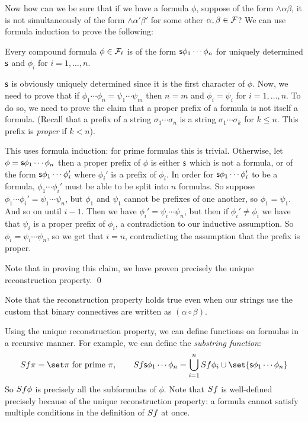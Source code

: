 \elemm

Now how can we be sure that if we have a formula $\phi$, suppose of the form $\land\alpha\beta$,
it is not simultaneously of the form $\land\alpha'\beta'$ for some other
$\alpha,\beta\in{\cal F}$?
We can use formula induction to prove the following:

\blemm[title=The Unique Formula Reconstruction Property]

    Every compound formula $\phi\in{\cal F}_\ell$ is of the form ${\sf s}\phi_1\cdots\phi_n$ for
    uniquely determined ${\sf s}$ and $\phi_i$ for $i=1,\dots,n$.

\elemm

\Proof ${\sf s}$ is obviously uniquely determined since it is the first character of $\phi$.
Now, we need to prove that if $\phi_1\cdots\phi_n=\psi_1\cdots\psi_m$ then $n=m$ and $\phi_i=\psi_i$
for $i=1,\dots,n$.
To do so, we need to prove the claim that a proper prefix of a formula is not itself a formula.
(Recall that a prefix of a string $\sigma_1\cdots\sigma_n$ is a string $\sigma_1\cdots\sigma_k$ for
$k\leq n$.
This prefix is {\it proper} if $k<n$).

This uses formula induction: for prime formulas this is trivial.
Otherwise, let $\phi={\sf s}\phi_1\cdots\phi_n$ then a proper prefix of $\phi$ is either ${\sf s}$ which
is not a formula, or of the form ${\sf s}\phi_1\cdots\phi_i'$ where $\phi_i'$ is a prefix of
$\phi_i$.
In order for ${\sf s}\phi_1\cdots\phi_i'$ to be a formula, $\phi_1\cdots\phi_i'$ must be able to be
split into $n$ formulas.
So suppose $\phi_1\cdots\phi_i'=\psi_1\cdots\psi_n$, but $\phi_1$ and $\psi_1$ cannot be prefixes
of one another, so $\phi_1=\psi_1$.
And so on until $i-1$.
Then we have $\phi_i'=\psi_i\cdots\psi_n$, but then if $\phi_i'\neq\phi_i$ we have that $\psi_i$
is a proper prefix of $\phi_i$, a contradiction to our inductive assumption.
So $\phi_i=\psi_i\cdots\psi_n$, so we get that $i=n$, contradicting the assumption that the prefix
is proper.

Note that in proving this claim, we have proven precisely the unique reconstruction property.
\qed

Note that the reconstruction property holds true even when our strings use the custom that binary
connectives are written as $(\alpha\circ\beta)$.

Using the unique reconstruction property, we can define functions on formulas in a recursive
manner.
For example, we can define the {\it substring function}:
$$ {\sl Sf}\pi=\set\pi\hbox{ for prime $\pi$},
\qquad {\sl Sf}\s s\phi_1\cdots\phi_n=\bigcup_{i=1}^n{\sl Sf}\phi_i\cup
\set{\s s\phi_1\cdots\phi_n} $$
So ${\sl Sf}\phi$ is precisely all the subformulas of $\phi$.
Note that ${\sl Sf}$ is well-defined precisely because of the unique reconstruction property: a
formula cannot satisfy multiple conditions in the definition of ${\sl Sf}$ at once.

